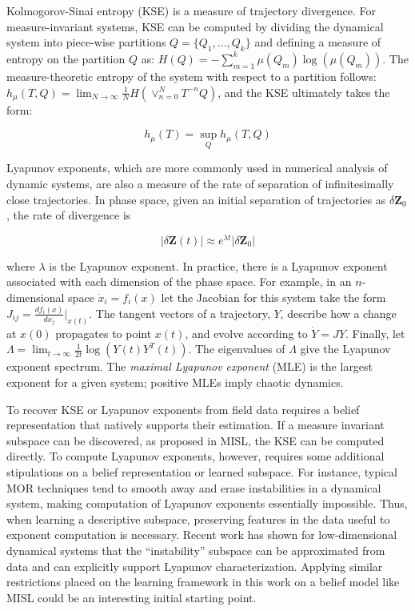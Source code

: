 Kolmogorov-Sinai entropy (KSE) is a measure of trajectory divergence.
For measure-invariant systems, KSE can be computed by dividing the dynamical system into piece-wise partitions $Q = \{Q_1,...,Q_k\}$ and defining a measure of entropy on the partition $Q$ as: $H(Q) = -\sum_{m=1}^k\mu(Q_m)\log(\mu(Q_m))$.
The measure-theoretic entropy of the system with respect to a partition follows: $h_\mu(T,Q) = \lim_{N\longrightarrow\infty} \frac{1}{N}H(\vee_{n=0}^N T^{-n}Q)$, and the KSE ultimately takes the form:

\begin{equation}
    h_\mu(T) = \sup_Q h_\mu(T,Q)
\end{equation}

Lyapunov exponents, which are more commonly used in numerical analysis of dynamic systems, are also a measure of the rate of separation of infinitesimally close trajectories.
In phase space, given an initial separation of trajectories as $\delta\mathbf{Z}_0$, the rate of divergence is

\begin{equation}
    |\delta\mathbf{Z}(t)| \approx e^{\lambda t}|\delta \mathbf{Z}_0|
\end{equation}

\noindent where $\lambda$ is the Lyapunov exponent. 
In practice, there is a Lyapunov exponent associated with each dimension of the phase space.
For example, in an $n$-dimensional space $\dot{x}_i = f_i(x)$ let the Jacobian for this system take the form $J_{ij} = \frac{df_i(x)}{dx_j}\Big|_{x(t)}$.
The tangent vectors of a trajectory, $Y$, describe how a change at $x(0)$ propagates to point $x(t)$, and evolve according to $\dot{Y} = JY$.
Finally, let $\Lambda = \lim_{t\longrightarrow \infty} \frac{1}{2t}\log(Y(t)Y^T(t))$.
The eigenvalues of $\Lambda$ give the Lyapunov exponent spectrum.
The \emph{maximal Lyapunov exponent} (MLE) is the largest exponent for a given system; positive MLEs imply chaotic dynamics.

To recover KSE or Lyapunov exponents from field data requires a belief representation that natively supports their estimation. If a measure invariant subspace can be discovered, as proposed in MISL, the KSE can be computed directly. To compute Lyapunov exponents, however, requires some additional stipulations on a belief representation or learned subspace. For instance, typical MOR techniques tend to smooth away and erase instabilities in a dynamical system, making computation of Lyapunov exponents essentially impossible. Thus, when learning a descriptive subspace, preserving features in the data useful to exponent computation is necessary. Recent work has shown for low-dimensional dynamical systems that the ``instability'' subspace can be approximated from data\autocite{blanchard2019learning,blanchard2019analytical} and can explicitly support Lyapunov characterization. Applying similar restrictions placed on the learning framework in this work on a belief model like MISL could be an interesting initial starting point.




